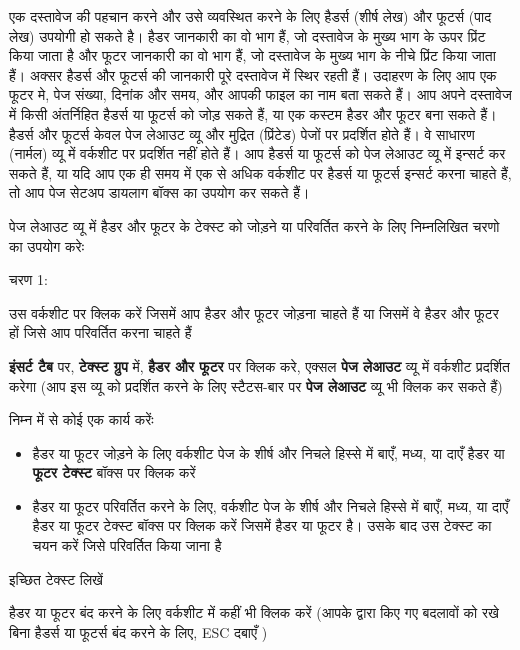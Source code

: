 एक दस्तावेज की पहचान करने और उसे व्यवस्थित करने के लिए हैडर्स (शीर्ष लेख) और फूटर्स (पाद लेख) उपयोगी हो सकते है। हैडर जानकारी का वो भाग हैं, जो दस्तावेज के मुख्य भाग के ऊपर प्रिंट किया जाता है और फूटर जानकारी का वो भाग हैं, जो दस्तावेज के मुख्य भाग के नीचे प्रिंट किया जाता हैं। अक्सर हैडर्स और फूटर्स की जानकारी पूरे दस्तावेज में स्थिर रहती हैं। उदाहरण के लिए आप एक फूटर मे, पेज संख्या, दिनांक और समय, और आपकी फाइल का नाम बता सकते हैं। आप अपने दस्तावेज में किसी अंतर्निहित हैडर्स या फूटर्स को जोड़ सकते हैं, या एक कस्टम हैडर और फूटर बना सकते हैं। हैडर्स और फूटर्स केवल पेज लेआउट व्यू और मुद्रित (प्रिंटेड) पेजों पर प्रदर्शित होते हैं। वे साधारण (नार्मल) व्यू में वर्कशीट पर प्रदर्शित नहीं होते हैं। आप हैडर्स या फूटर्स को पेज लेआउट व्यू में इन्सर्ट कर सकते हैं, या यदि आप एक ही समय में एक से अधिक वर्कशीट पर हैडर्स या फूटर्स इन्सर्ट करना चाहते हैं, तो आप पेज सेटअप डायलाग बॉक्स का उपयोग कर सकते हैं।

पेज लेआउट व्यू में हैडर और फूटर के टेक्स्ट को जोड़ने या परिवर्तित करने के लिए निम्नलिखित चरणो का उपयोग करेः
\begin{descriptionSimple}{चरण 1:}
\item[चरण 1] उस वर्कशीट पर क्लिक करें जिसमें आप हैडर और फूटर जोड़ना चाहते हैं या जिसमें वे हैडर और फूटर हों जिसे आप परिवर्तित करना चाहते हैं
\item[चरण 2] \textbf{इंसर्ट टैब} पर, \textbf{टेक्स्ट ग्रुप} में, \textbf{हैडर और फूटर} पर क्लिक करे, एक्सल \textbf{पेज लेआउट} व्यू में वर्कशीट प्रदर्शित करेगा (आप इस व्यू को प्रदर्शित करने के लिए स्टैटस-बार पर \textbf{पेज लेआउट} व्यू भी क्लिक कर सकते हैं)
\item[चरण  3] निम्न में से कोई एक कार्य करेंः
			\begin{itemize}[topsep=-1ex,parsep=0ex,partopsep=0ex,itemsep=0.5ex]
			\item हैडर या फूटर जोड़ने के लिए वर्कशीट पेज के शीर्ष और निचले हिस्से में बाएँ, मध्य, या दाएँ हैडर या \textbf{फूटर टेक्स्ट} बॉक्स पर क्लिक करें
			\item हैडर या फूटर परिवर्तित करने के लिए, वर्कशीट पेज के शीर्ष और निचले हिस्से में बाएँ, मध्य, या दाएँ हैडर या फूटर टेक्स्ट बॉक्स पर क्लिक करें जिसमें हैडर या फूटर है। उसके बाद उस टेक्स्ट का चयन करें जिसे परिवर्तित किया जाना है
			\end{itemize}
\item[चरण 4] इच्छित टेक्स्ट लिखें
\end{descriptionSimple}

हैडर या फूटर बंद करने के लिए वर्कशीट में कहीं भी क्लिक करें (आपके द्वारा किए गए बदलावों को रखे बिना हैडर्स या फूटर्स बंद करने के लिए,  {\eng ESC}  दबाएँ )

